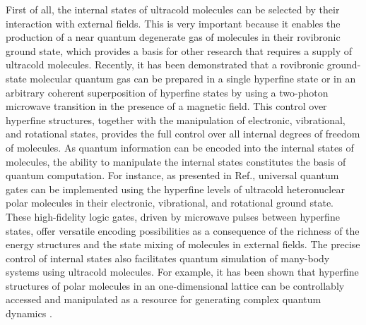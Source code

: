 First of all, the internal states of ultracold molecules can be selected by their interaction with  
external fields. This is very important because it enables the production of a near quantum degenerate gas of 
molecules in their rovibronic ground state\cite{ni2008, danzl2010}, which provides a basis for other research that 
requires a supply of  ultracold molecules. 
Recently, it has been demonstrated that a rovibronic ground-state molecular quantum gas  can be prepared in a single 
hyperfine state or in an arbitrary coherent superposition of hyperfine states\cite{ospelkaus2010} by using a two-photon
microwave transition in the presence of a magnetic field. This control over hyperfine structures, together with the 
manipulation of electronic, vibrational, and rotational states, provides the full control over all internal degrees of
freedom of molecules. As quantum information can be encoded 
into the internal states of molecules,  the ability to manipulate the internal states constitutes the basis of 
quantum computation. For instance, as presented in Ref.\cite{pellegrini2011},  universal quantum gates can be 
implemented using the hyperfine levels of ultracold 
heteronuclear polar molecules in their electronic, vibrational, and rotational ground state. These high-fidelity 
logic gates, driven by microwave pulses between hyperfine states, offer versatile encoding possibilities as a 
consequence of the richness of the energy structures and the state mixing of molecules in external fields. The precise control of internal states also 
facilitates quantum simulation of many-body systems using ultracold molecules. For example, it has been shown that hyperfine structures of polar molecules in an one-dimensional 
lattice can be controllably accessed and manipulated as a resource for generating complex quantum dynamics
\cite{Carr2}.  


